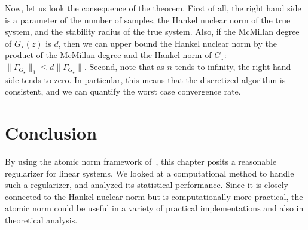 \noindent Now, let us look the consequence of the theorem. First of all, the
right hand side is a parameter of the number of samples, the Hankel nuclear norm
of the true system, and the stability radius of the true system. Also, if the
McMillan degree of $G_\star(z)$ is $d$, then we can upper bound the Hankel
nuclear norm by the product of the McMillan degree and the Hankel norm of
$G_\star$: $\|\Gamma_{G_\star}\|_1 \leq d \|\Gamma_{G_\star}\|$. Second, note
that as $n$ tends to infinity, the right hand side tends to zero. In particular,
this means that the discretized algorithm is consistent, and we can quantify the
worst case convergence rate.

\section{Conclusion}\label{sec:conclusion}

By using the atomic norm framework of~\cite{crpw}, this chapter posits a
reasonable regularizer for linear systems. We looked at a computational method
to handle such a regularizer, and analyzed its statistical performance. Since it
is closely connected to the Hankel nuclear norm but is computationally more
practical, the atomic norm could be useful in a variety of practical
implementations and also in theoretical analysis.



% 

